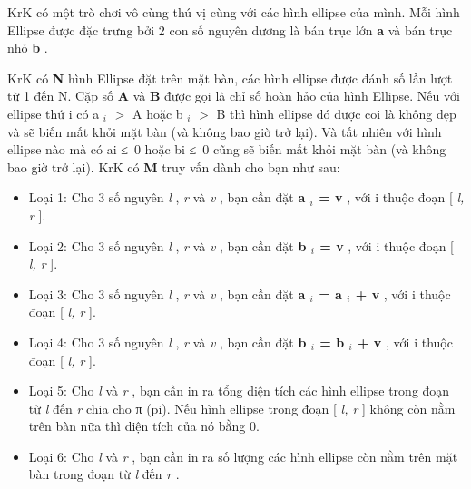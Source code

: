 KrK có một trò chơi vô cùng thú vị cùng với các hình ellipse của mình. Mỗi hình Ellipse được đặc trưng bởi 2 con số nguyên dương là bán trục lớn   \textbf{    a   }   và bán trục nhỏ   \textbf{    b   }   .  

   KrK có   \textbf{    N   }   hình Ellipse đặt trên mặt bàn, các hình ellipse được đánh số lần lượt từ 1 đến N. Cặp số   \textbf{    A   }   và   \textbf{    B   }   được gọi là chỉ số hoàn hảo của hình Ellipse. Nếu với ellipse thứ i có a   $_    i   $   $>$ A hoặc b   $_    i   $   $>$ B thì hình ellipse đó được coi là không đẹp và sẽ biến mất khỏi mặt bàn (và không bao giờ trở lại). Và tất nhiên với hình ellipse nào mà có ai ≤ 0 hoặc bi ≤ 0 cũng sẽ biến mất khỏi mặt bàn (và không bao giờ trở lại). KrK có   \textbf{    M   }   truy vấn dành cho bạn như sau:  


\begin{itemize}
	\item     Loại 1: Cho 3 số nguyên    \emph{     l    }    ,    \emph{     r    }    và    \emph{     v    }    , bạn cần đặt    \textbf{     a     $_      i     $     = v    }    , với i thuộc đoạn [    \emph{     l, r    }    ].   
	\item     Loại 2: Cho 3 số nguyên    \emph{     l    }    ,    \emph{     r    }    và    \emph{     v    }    , bạn cần đặt    \textbf{     b     $_      i     $     = v    }    , với i thuộc đoạn [    \emph{     l, r    }    ].   
	\item     Loại 3: Cho 3 số nguyên    \emph{     l    }    ,    \emph{     r    }    và    \emph{     v    }    , bạn cần đặt    \textbf{     a     $_      i     $     = a     $_      i     $     + v    }    , với i thuộc đoạn [    \emph{     l, r    }    ].   
	\item     Loại 4: Cho 3 số nguyên    \emph{     l    }    ,    \emph{     r    }    và    \emph{     v    }    , bạn cần đặt    \textbf{     b     $_      i     $     = b     $_      i     $     + v    }    , với i thuộc đoạn [    \emph{     l, r    }    ].   
	\item     Loại 5: Cho    \emph{     l    }    và    \emph{     r    }    , bạn cần in ra tổng diện tích các hình ellipse trong đoạn từ    \emph{     l    }    đến    \emph{     r    }    chia cho π (pi). Nếu hình ellipse trong đoạn [    \emph{     l, r    }    ] không còn nằm trên bàn nữa thì diện tích của nó bằng 0.   
	\item     Loại 6: Cho    \emph{     l    }    và    \emph{     r    }    , bạn cần in ra số lượng các hình ellipse còn nằm trên mặt bàn trong đoạn từ    \emph{     l    }    đến    \emph{     r    }    .   
\end{itemize}